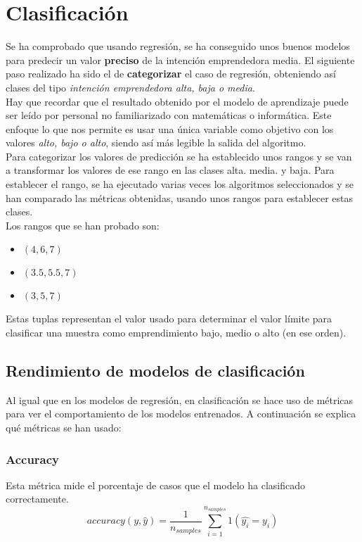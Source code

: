 \chapter{Clasificación}
Se ha comprobado que usando regresión, se ha conseguido unos buenos modelos para predecir un valor \textbf{preciso} de la intención emprendedora media. El siguiente paso realizado ha sido el de \textbf{categorizar} el caso de regresión, obteniendo así clases del tipo \textit{intención emprendedora alta, baja o media}.\\
Hay que recordar que el resultado obtenido por el modelo de aprendizaje puede ser leído por personal no familiarizado con matemáticas o informática. Este enfoque lo que nos permite es usar una única variable como objetivo con los valores \textit{alto, bajo o alto}, siendo así más legible la salida del algoritmo.\\
\linebreak
Para categorizar los valores de predicción se ha establecido unos rangos y se van a transformar los valores de ese rango en las clases alta. media. y baja. Para establecer el rango, se ha ejecutado varias veces los algoritmos seleccionados y se han comparado las métricas obtenidas, usando unos rangos para establecer estas clases.\\
Los rangos que se han probado son:
\begin{itemize}
	\item $(4, 6, 7)$
	\item $(3.5, 5.5, 7)$
	\item $(3, 5, 7)$
\end{itemize}
Estas tuplas representan el valor usado para determinar el valor límite para clasificar una muestra como emprendimiento bajo, medio o alto (en ese orden).\\
\linebreak
\section{Rendimiento de modelos de clasificación}
Al igual que en los modelos de regresión, en clasificación se hace uso de métricas para ver el comportamiento de los modelos entrenados. A continuación se explica qué métricas se han usado:
\subsection{Accuracy}
Esta métrica mide el porcentaje de casos que el modelo ha clasificado correctamente.
\[
	accuracy(y,\hat{y})=\frac{1}{n_{samples}}\sum_{i=1}^{n_{samples}}1(\hat{y_i}=y_i)
\]

